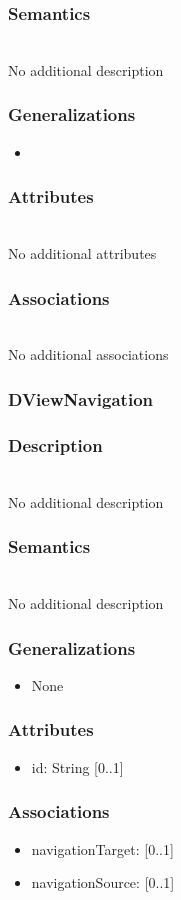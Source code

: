 \documentclass{article}
\begin{document}
\subsubsection*{Semantics} ~\\ No additional description
\subsubsection*{Generalizations}
\begin{itemize}
\item {}
\end{itemize}
\subsubsection*{Attributes} ~\\ No additional attributes
\subsubsection*{Associations} ~\\ No additional associations
\subsubsection{DViewNavigation}\label{DViewNavigation} 
\subsubsection*{Description} ~\\ No additional description
\subsubsection*{Semantics} ~\\ No additional description
\subsubsection*{Generalizations}
\begin{itemize}
\item None
\end{itemize}
\subsubsection*{Attributes}
\begin{itemize}
\item id: String [0..1] 
\end{itemize}
\subsubsection*{Associations}
\begin{itemize}
\item navigationTarget:  [0..1] 
\item navigationSource:  [0..1] 
\end{itemize}
\end{document}
